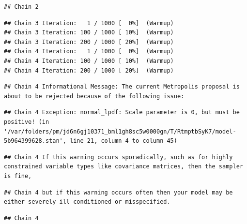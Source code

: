 \documentclass[
]{book}
\begin{document}
\begin{verbatim}
## Chain 2
\end{verbatim}

\begin{verbatim}
## Chain 3 Iteration:   1 / 1000 [  0%]  (Warmup) 
## Chain 3 Iteration: 100 / 1000 [ 10%]  (Warmup) 
## Chain 3 Iteration: 200 / 1000 [ 20%]  (Warmup) 
## Chain 4 Iteration:   1 / 1000 [  0%]  (Warmup) 
## Chain 4 Iteration: 100 / 1000 [ 10%]  (Warmup) 
## Chain 4 Iteration: 200 / 1000 [ 20%]  (Warmup)
\end{verbatim}

\begin{verbatim}
## Chain 4 Informational Message: The current Metropolis proposal is about to be rejected because of the following issue:
\end{verbatim}

\begin{verbatim}
## Chain 4 Exception: normal_lpdf: Scale parameter is 0, but must be positive! (in '/var/folders/pm/jd6n6gj10371_bml1gh8sc5w0000gn/T/RtmptbSyK7/model-5b964399628.stan', line 21, column 4 to column 45)
\end{verbatim}

\begin{verbatim}
## Chain 4 If this warning occurs sporadically, such as for highly constrained variable types like covariance matrices, then the sampler is fine,
\end{verbatim}

\begin{verbatim}
## Chain 4 but if this warning occurs often then your model may be either severely ill-conditioned or misspecified.
\end{verbatim}

\begin{verbatim}
## Chain 4
\end{verbatim}
\end{document}
